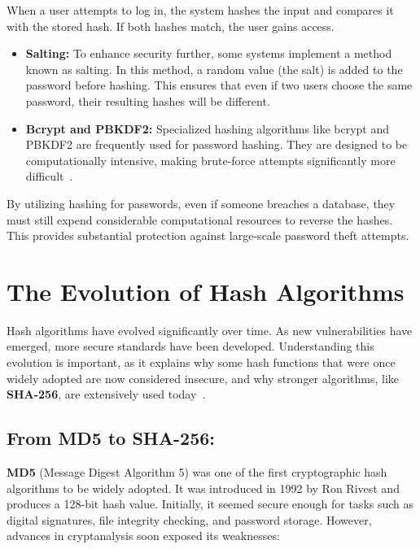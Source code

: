 \documentclass[11pt,a4paper]{article}
\begin{document}
    When a user attempts to log in, the system hashes the input and compares it with the stored hash. If both hashes match, the user gains access.
        \begin{itemize}
            \item \textbf{Salting:} To enhance security further, some systems implement a method known as salting. In this method, a random value (the salt) is added to the password before hashing. This ensures that even if two users choose the same password, their resulting hashes will be different.

            \item \textbf{Bcrypt and PBKDF2:} Specialized hashing algorithms like bcrypt and PBKDF2 are frequently used for password hashing. They are designed to be computationally intensive, making brute-force attempts significantly more difficult~\cite{Bcrypt}\cite{Bcrypt-2}.

        \end{itemize}
        By utilizing hashing for passwords, even if someone breaches a database, they must still expend considerable computational resources to reverse the hashes. This provides substantial protection against large-scale password theft attempts.

\section*{The Evolution of Hash Algorithms}
Hash algorithms have evolved significantly over time. As new vulnerabilities have emerged, more secure standards have been developed. Understanding this evolution is important, as it explains why some hash functions that were once widely adopted are now considered insecure, and why stronger algorithms, like \textbf{SHA-256}, are extensively used today~\cite{Evolution-of-Hash}.

    \subsection*{From MD5 to SHA-256:}
    \textbf{MD5} (Message Digest Algorithm 5) was one of the first cryptographic hash algorithms to be widely adopted. It was introduced in 1992 by Ron Rivest and produces a 128-bit hash value. Initially, it seemed secure enough for tasks such as digital signatures, file integrity checking, and password storage. However, advances in cryptanalysis soon exposed its weaknesses:
\end{document}
